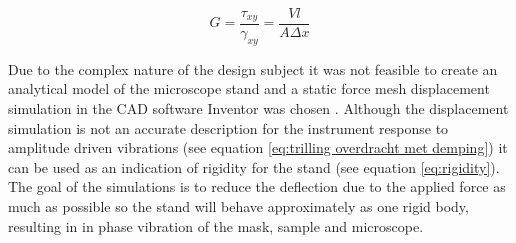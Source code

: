\documentclass[10pt]{article}
\begin{document}
\begin{equation}
    G = \frac{\tau_{xy}}{\gamma_{xy}} = \frac{Vl}{A\Delta{x}}
    \label{eq:rigidity}
\end{equation}

Due to the complex nature of the design subject it was not feasible to create an analytical model of the microscope stand and a static force mesh displacement simulation in the CAD software Inventor was chosen \cite{EvaluateStressDisplacement}. 
Although the displacement simulation is not an accurate description for the instrument response to amplitude driven vibrations (see equation \ref{eq:trilling overdracht met demping}) it can be used as an indication of rigidity for the stand (see equation \ref{eq:rigidity}).
The goal of the simulations is to reduce the deflection due to the applied force as much as possible so the stand will behave approximately as one rigid body, resulting in in phase vibration of the mask, sample and microscope.
\end{document}
